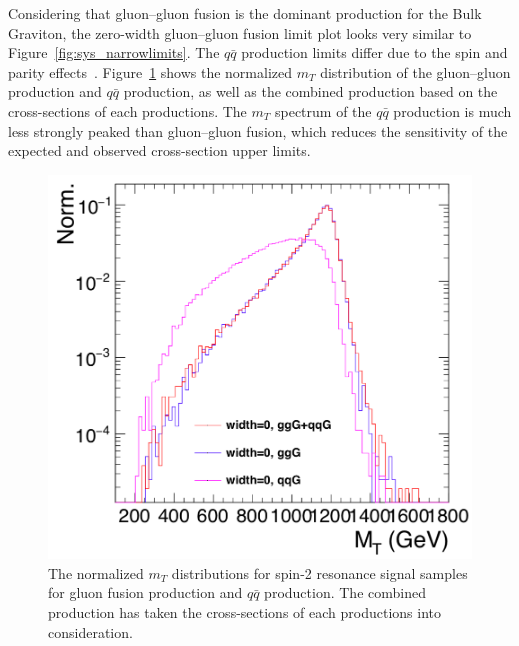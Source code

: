 \vspace{0.3cm}
Considering that gluon–gluon fusion is the dominant production for the Bulk Graviton, the zero-width gluon–gluon fusion limit plot looks very similar to Figure~\ref{fig:sys_narrowlimits}. The $q\bar{q}$ production limits differ due to the spin and parity effects~\cite{sys_resoproduction}. Figure~\ref{fig:sys_ggqqdiff} shows the normalized $m_T$ distribution of the gluon–gluon production and $q\bar{q}$ production, as well as the combined production based on the cross-sections of each productions. The $m_T$ spectrum of the $q\bar{q}$ production is much less strongly peaked than gluon–gluon fusion, which reduces the sensitivity of the expected and observed cross-section upper limits.
\begin{figure}[htbp]
\begin{center}
\includegraphics[width=0.9\linewidth]{figures/sys_ggqqdiff.png}
\caption{The normalized $m_T$ distributions for spin-2 resonance signal samples for gluon fusion production and $q\bar{q}$ production. The combined production has taken the cross-sections of each productions into consideration.}
\label{fig:sys_ggqqdiff}
\end{center}
\end{figure}
